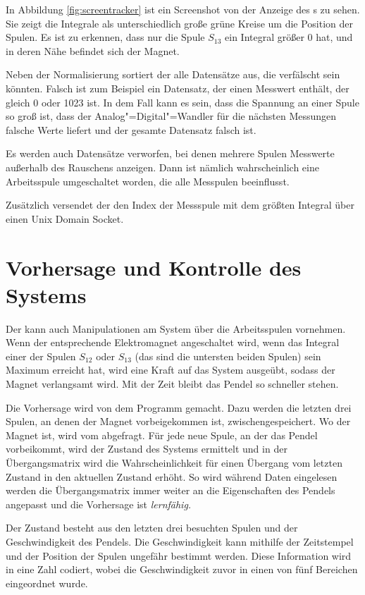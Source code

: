 In Abbildung \ref{fig:screentracker} ist ein Screenshot von der Anzeige des s zu sehen.
Sie zeigt die Integrale als unterschiedlich große grüne Kreise um die Position der Spulen.
Es ist zu erkennen, dass nur die Spule $S_{13}$ ein Integral größer 0 hat, und in deren Nähe befindet sich der Magnet.

Neben der Normalisierung sortiert der  alle Datensätze aus, die verfälscht sein könnten.
Falsch ist zum Beispiel ein Datensatz, der einen Messwert enthält, der gleich 0 oder 1023 ist. In dem Fall kann es sein, dass die Spannung an einer Spule so groß ist, dass der Analog"=Digital"=Wandler für die nächsten Messungen falsche Werte liefert und der gesamte Datensatz falsch ist.

Es werden auch Datensätze verworfen, bei denen mehrere Spulen Messwerte außerhalb des Rauschens anzeigen.
Dann ist nämlich wahrscheinlich eine Arbeitsspule umgeschaltet worden, die alle Messpulen beeinflusst.

Zusätzlich versendet der  den Index der Messspule mit dem größten Integral über einen Unix Domain Socket.

\section{Vorhersage und Kontrolle des Systems}

Der  kann auch Manipulationen am System über die Arbeitsspulen vornehmen.
Wenn der entsprechende Elektromagnet angeschaltet wird, wenn das Integral einer der Spulen $S_{12}$ oder $S_{13}$ (das sind die untersten beiden Spulen) sein Maximum erreicht hat, wird eine Kraft auf das System ausgeübt, sodass der Magnet verlangsamt wird.
Mit der Zeit bleibt das Pendel so schneller stehen.

Die Vorhersage wird von dem Programm  gemacht.
Dazu werden die letzten drei Spulen, an denen der Magnet vorbeigekommen ist, zwischengespeichert.
Wo der Magnet ist, wird vom  abgefragt.
Für jede neue Spule, an der das Pendel vorbeikommt, wird der Zustand des Systems ermittelt und in der Übergangsmatrix wird die Wahrscheinlichkeit für einen Übergang vom letzten Zustand in den aktuellen Zustand erhöht.
So wird während Daten eingelesen werden die Übergangsmatrix immer weiter an die Eigenschaften des Pendels angepasst und die Vorhersage ist \textit{lernfähig.}

Der Zustand besteht aus den letzten drei besuchten Spulen und der Geschwindigkeit des Pendels.
Die Geschwindigkeit kann mithilfe der Zeitstempel und der Position der Spulen ungefähr bestimmt werden.
Diese Information wird in eine Zahl codiert, wobei die Geschwindigkeit zuvor in einen von fünf Bereichen eingeordnet wurde.

